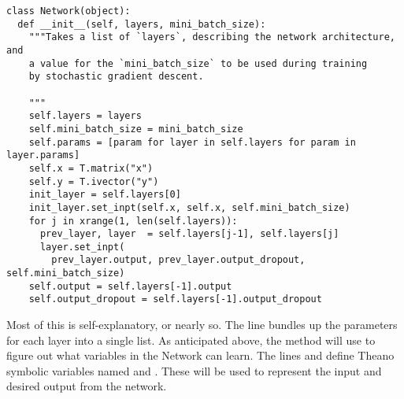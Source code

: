 \documentclass[a4paper,twoside,10pt]{book}
\begin{document}
\begin{lstlisting}
class Network(object):
  def __init__(self, layers, mini_batch_size):
    """Takes a list of `layers`, describing the network architecture, and
    a value for the `mini_batch_size` to be used during training
    by stochastic gradient descent.

    """
    self.layers = layers
    self.mini_batch_size = mini_batch_size
    self.params = [param for layer in self.layers for param in layer.params]
    self.x = T.matrix("x")
    self.y = T.ivector("y")
    init_layer = self.layers[0]
    init_layer.set_inpt(self.x, self.x, self.mini_batch_size)
    for j in xrange(1, len(self.layers)):
      prev_layer, layer  = self.layers[j-1], self.layers[j]
      layer.set_inpt(
        prev_layer.output, prev_layer.output_dropout, self.mini_batch_size)
    self.output = self.layers[-1].output
    self.output_dropout = self.layers[-1].output_dropout
\end{lstlisting}
Most of this is self-explanatory, or nearly so. The line  bundles up the parameters for each layer into a single list. As anticipated above, the  method will use  to figure out what variables in the Network can learn. The lines  and  define Theano symbolic variables named  and . These will be used to represent the input and desired output from the network.
\end{document}
